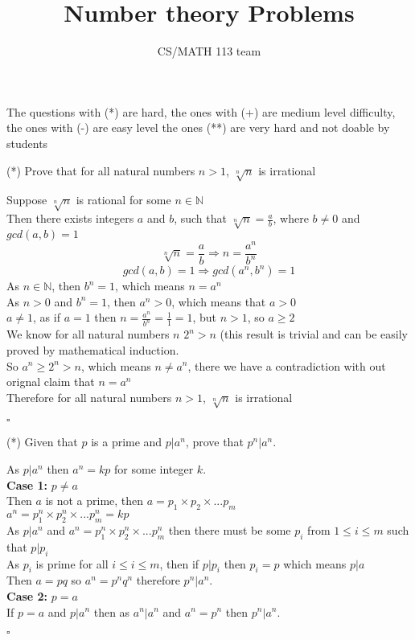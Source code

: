 \documentclass{exam}
\title{Number theory Problems}
\author{CS/MATH 113 team}
\begin{document}
\maketitle
The questions with (*) are hard, the ones with (+) are medium level difficulty, the ones with (-) are easy level the ones (**) are very hard and not doable by students
\begin{questions}
    \question (*) Prove that for all natural numbers $n>1$, $ \sqrt[n]{n}$ is irrational
    \begin{solution}
        Suppose $\sqrt[n]{n}$ is rational for some $n \in \mathbb{N}$
        \\Then there exists integers $a$ and $b$, such that $\sqrt[n]{n} = \frac{a}{b}$, where $b \neq 0$ and $gcd(a,b) =1$
        $$\sqrt[n]{n} = \frac{a}{b} \Rightarrow n = \frac{a^n}{b^n}$$
        $$gcd(a,b) =1 \Rightarrow gcd(a^n,b^n) =1$$
        As $n \in \mathbb{N}$, then $b^n = 1$, which means $n = a^n$
        \\As $n > 0$ and $b^n = 1$, then $a^n > 0$, which means that $a > 0$
        \\$a \neq 1$, as if $a = 1$ then $n = \frac{a^n}{b^n} = \frac{1}{1} = 1$, but $n > 1$, so $a \geq 2$
        \\We know for all natural numbers $n$ $2^n > n$ (this result is trivial and can be easily proved by mathematical induction.
        \\So $a^n \geq 2^n > n$, which means $n \neq a^n$, there we have a contradiction with out orignal claim that $n = a^n$
        \\Therefore for all natural numbers $n>1$, $ \sqrt[n]{n}$ is irrational
        \begin{flushright}
            $\square$
        \end{flushright}
    \end{solution}

    \question (*) Given that $p$ is a prime and $p|a^n$, prove that $p^n|a^n$.
    \begin{solution}
        As $p|a^n$ then $a^n = kp$ for some integer $k$.
        \\\textbf{Case 1:} $p \neq a$
        \\Then $a$ is not a prime, then $a = p_1\times p_2 \times ... p_m$
        \\$a^n = p_1^n\times p_2^n \times ... p_m^n = kp$
        \\As $p|a^n$ and $a^n = p_1^n\times p_2^n \times ... p_m^n$ then there must be some $p_i$ from $1\leq i \leq m$ such that $p|p_i$
        \\As $p_i$ is prime for all $i \leq i \leq m$, then if $p|p_i$ then $p_i = p$ which means $p|a$
        \\Then $a = pq$ so $a^n = p^n q^n$ therefore $p^n|a^n$.
        \\\textbf{Case 2:} $p = a$ 
        \\If $p = a$  and $p|a^n$ then as $a^n|a^n$ and $a^n=p^n$ then $p^n|a^n$.
        \begin{flushright}
            $\square$
        \end{flushright}
    \end{solution}
    \pagebreak


\end{questions}
\end{document}
